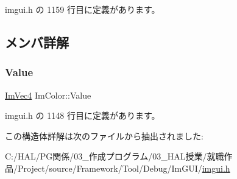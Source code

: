  imgui.\+h の 1159 行目に定義があります。



\subsection{メンバ詳解}
\mbox{\label{struct_im_color_a4cf43bd58e30decaa0248f839fc85e95}} 
\subsubsection{\texorpdfstring{Value}{Value}}
{\footnotesize\ttfamily \mbox{\hyperlink{struct_im_vec4}{Im\+Vec4}} Im\+Color\+::\+Value}



 imgui.\+h の 1148 行目に定義があります。



この構造体詳解は次のファイルから抽出されました\+:\begin{DoxyCompactItemize}
\item 
C\+:/\+H\+A\+L/\+P\+G関係/03\+\_\+作成プログラム/03\+\_\+\+H\+A\+L授業/就職作品/\+Project/source/\+Framework/\+Tool/\+Debug/\+Im\+G\+U\+I/\mbox{\hyperlink{imgui_8h}{imgui.\+h}}\end{DoxyCompactItemize}
